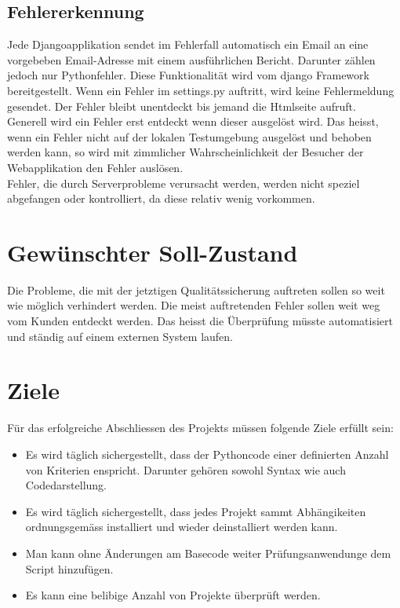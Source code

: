 \subsection{Fehlererkennung}
Jede Djangoapplikation sendet im Fehlerfall automatisch ein Email an eine vorgebeben Email-Adresse mit einem ausführlichen Bericht. Darunter zählen jedoch nur Pythonfehler. Diese Funktionalität wird vom django Framework bereitgestellt. Wenn ein Fehler im settings.py auftritt, wird keine Fehlermeldung gesendet. Der Fehler bleibt unentdeckt bis jemand die Htmlseite aufruft. \\
Generell wird ein Fehler erst entdeckt wenn dieser ausgelöst wird. Das heisst, wenn ein Fehler nicht auf der lokalen Testumgebung ausgelöst und behoben werden kann, so wird mit zimmlicher Wahrscheinlichkeit der Besucher der Webapplikation den Fehler auslösen. \\
Fehler, die durch Serverprobleme verursacht werden, werden nicht speziel abgefangen oder kontrolliert, da diese relativ wenig vorkommen. 

\section{Gewünschter Soll-Zustand}
Die Probleme, die mit der jetztigen Qualitätssicherung auftreten sollen so weit wie möglich verhindert werden. Die meist auftretenden Fehler sollen weit weg vom Kunden entdeckt werden. Das heisst die Überprüfung müsste automatisiert und ständig auf einem externen System laufen.

\section{Ziele}
Für das erfolgreiche Abschliessen des Projekts müssen folgende Ziele erfüllt sein:
\begin{itemize}
    \item Es wird täglich sichergestellt, dass der Pythoncode einer definierten Anzahl von Kriterien enspricht. 
          Darunter gehören sowohl Syntax wie auch Codedarstellung.
    \item Es wird täglich sichergestellt, dass jedes Projekt sammt Abhängikeiten ordnungsgemäss installiert und wieder deinstalliert werden kann.
    \item Man kann ohne Änderungen am Basecode weiter Prüfungsanwendunge dem Script hinzufügen. 
    \item Es kann eine belibige Anzahl von Projekte überprüft werden.
\end{itemize}
\clearpage
